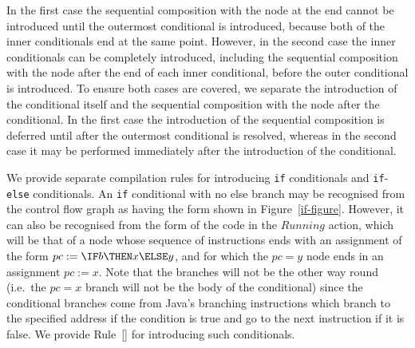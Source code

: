 In the first case the sequential composition with the node at the end
cannot be introduced until the outermost conditional is introduced,
because both of the inner conditionals end at the same point.
However, in the second case the inner conditionals can be completely
introduced, including the sequential composition with the node after
the end of each inner conditional, before the outer conditional is
introduced.
To ensure both cases are covered, we separate the introduction of the
conditional itself and the sequential composition with the node after
the conditional. 
In the first case the introduction of the sequential composition is
deferred until after the outermost conditional is resolved, whereas in
the second case it may be performed immediately after the introduction
of the conditional.

We provide separate compilation rules for introducing \texttt{if}
conditionals and \texttt{if}-\texttt{else} conditionals.
An \texttt{if} conditional with no else branch may be recognised from
the control flow graph as having the form shown in
Figure~\ref{if-figure}.
However, it can also be recognised from the form of the \Circus{} code
in the $Running$ action, which will be that of a node whose sequence
of instructions ends with an assignment of the form
$pc := \IF b \THEN x \ELSE y$, and for which the $pc = y$ node ends in
an assignment $pc := x$.
Note that the branches will not be the other way round (i.e.\
the $pc = x$ branch will not be the body of the conditional) since the
conditional branches come from Java's branching instructions which
branch to the specified address if the condition is true and go to the
next instruction if it is false.
We provide Rule~[] for introducing such
conditionals.
